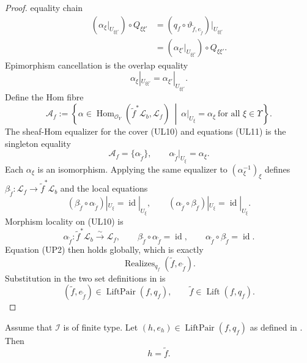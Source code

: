 \begin{proof}
  equality chain
  \[
  \begin{aligned}
    (\alpha_\xi|_{U_{\xi\xi'}})\circ Q_{\xi\xi'}
      &=(q_f\circ\vartheta_{\widetilde f,e_{\widetilde f}})
        |_{U_{\xi\xi'}}\\
      &=(\alpha_{\xi'}|_{U_{\xi\xi'}})\circ Q_{\xi\xi'}.
  \end{aligned}
  \]
  Epimorphism cancellation is the overlap equality
  \[
    \alpha_\xi|_{U_{\xi\xi'}}
      =\alpha_{\xi'}|_{U_{\xi\xi'}}.                           \tag{UL11}
  \]
  Define the Hom fibre
  \[
    \mathscr A_f:=
      \left\{\alpha\in
        \operatorname{Hom}_{\mathcal O_Y}
          (\widetilde f^*\mathcal L_b,\mathcal L_f)
        \ \middle|\
        \alpha|_{U_\xi}=\alpha_\xi\ \text{for all }\xi\in\Upsilon
      \right\}.
  \]
  The sheaf-Hom equalizer for the cover (UL10) and equations (UL11) is the
  singleton equality
  \[
    \mathscr A_f=\{\alpha_{\widetilde f}\},\qquad
    \alpha_{\widetilde f}|_{U_\xi}=\alpha_\xi.                 \tag{UL12}
  \]
  Each $\alpha_\xi$ is an isomorphism.  Applying the same equalizer to
  $(\alpha_\xi^{-1})_\xi$ defines
  $\beta_{\widetilde f}\colon\mathcal L_f\to
  \widetilde f^*\mathcal L_b$ and the local equations
  \[
    (\beta_{\widetilde f}\circ\alpha_{\widetilde f})|_{U_\xi}
      =\operatorname{id}|_{U_\xi},\qquad
    (\alpha_{\widetilde f}\circ\beta_{\widetilde f})|_{U_\xi}
      =\operatorname{id}|_{U_\xi}.
  \]
  Morphism locality on (UL10) is
  \[
    \alpha_{\widetilde f}\colon
      \widetilde f^*\mathcal L_b\xrightarrow{\ \sim\ }\mathcal L_f,\qquad
    \beta_{\widetilde f}\circ\alpha_{\widetilde f}
      =\operatorname{id},\qquad
    \alpha_{\widetilde f}\circ\beta_{\widetilde f}
      =\operatorname{id}.                                    \tag{UL13}
  \]
  Equation (UP2) then holds globally, which is
  exactly
  \[
    \operatorname{Realizes}_{q_f}
      (\widetilde f,e_{\widetilde f}).
  \]
  Substitution in the two set definitions in
   is
  \[
    (\widetilde f,e_{\widetilde f})
      \in\operatorname{LiftPair}(f,q_f),
    \qquad
    \widetilde f\in\operatorname{Lift}(f,q_f).
  \]
\end{proof}

\begin{lemma}
  \label{lemma:nagata-blowup-universal-unique}
  \lean{}

  Assume that $\mathcal I$ is of finite type.  Let
  $(h,e_h)\in\operatorname{LiftPair}(f,q_f)$ as defined in
  .  Then
  \[
    h=\widetilde f.
  \]
\end{lemma}


